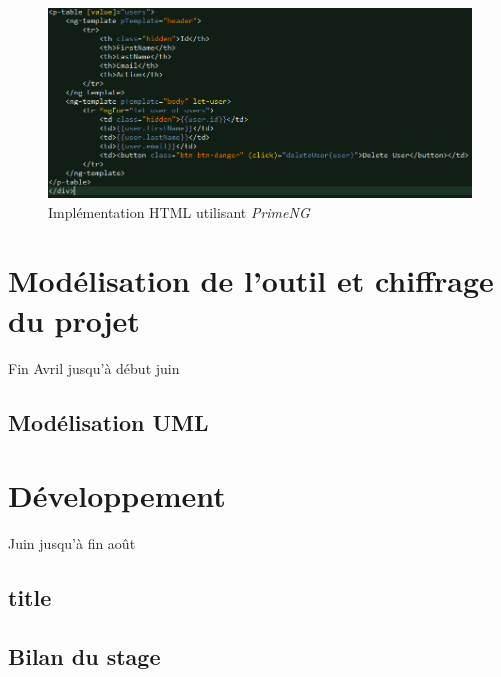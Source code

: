\documentclass{polytech/polytech}
\begin{document}
\begin{figure}
	\includegraphics[scale=0.6]{images/primeng_html}
	\caption{Implémentation HTML utilisant \textit{PrimeNG}}
	\label{fig:primeNGHTML}
\end{figure}

\part{Modélisation de l'outil et chiffrage du projet}

Fin Avril jusqu'à début juin

\chapter{Modélisation UML}


\part{Développement}

Juin jusqu'à fin août

\chapter{title}


\chapter{Bilan du stage}


\appendix
\end{document}
